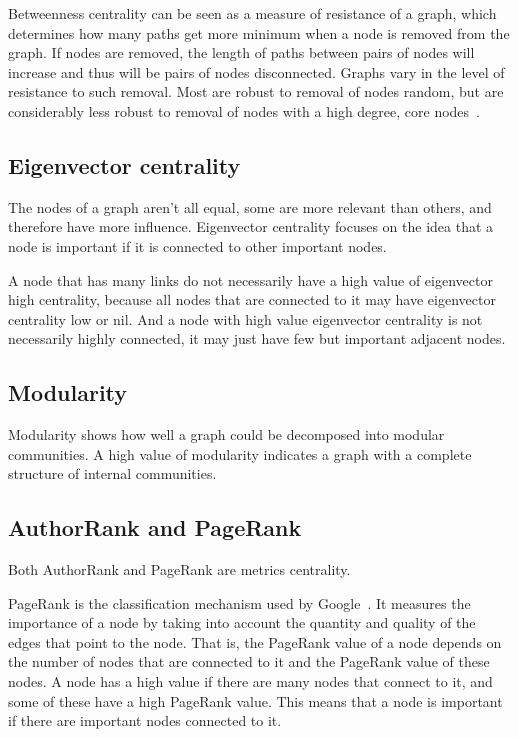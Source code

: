 \documentclass{article}
\begin{document}
\begin{multicols}{2}
Betweenness centrality can be seen as a measure of resistance of a graph, which determines how many paths get more minimum when a node is removed from the graph. If nodes are removed, the length of paths between pairs of nodes will increase and thus will be pairs of nodes disconnected. Graphs vary in the level of resistance to such removal. Most are robust to removal of nodes random, but are considerably less robust to removal of nodes with a high degree, core nodes~\cite{newman2003structure}.


\subsection{Eigenvector centrality}

The nodes of a graph aren’t all equal, some are more relevant than others, and therefore have more influence. Eigenvector centrality focuses on the idea that a node is important if it is connected to other important nodes.

A node that has many links do not necessarily have a high value of eigenvector high centrality, because all nodes that are connected to it may have eigenvector centrality low or nil. And a node with high value eigenvector centrality is not necessarily highly connected, it may just have few but important adjacent nodes.


\subsection{Modularity}

Modularity shows how well a graph could be decomposed into modular communities. A high value of modularity indicates a graph with a complete structure of internal communities.


\subsection{AuthorRank and PageRank}

Both AuthorRank and PageRank are metrics centrality.

PageRank is the classification mechanism used by Google~\cite{pagerank98, liu2005co}. It measures the importance of a node by taking into account the quantity and quality of the edges that point to the node. That is, the PageRank value of a node depends on the number of nodes that are connected to it and the PageRank value of these nodes. A node has a high value if there are many nodes that connect to it, and some of these have a high PageRank value. This means that a node is important if there are important nodes connected to it.


\end{multicols}
\end{document}
